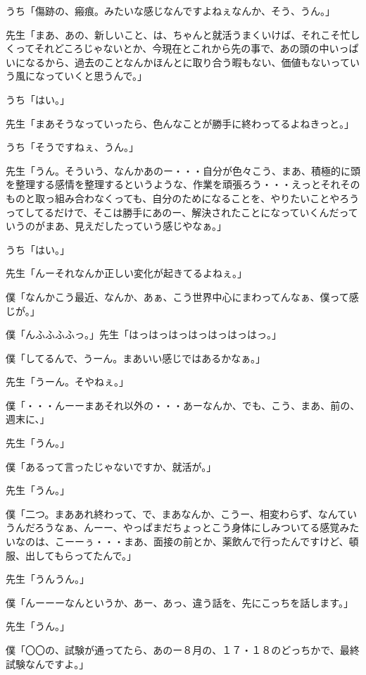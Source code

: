 \documentclass[b5j,twoside,twocolumn]{utarticle}
\begin{document}
\begin{description}
\item うち「傷跡の、瘢痕。みたいな感じなんですよねぇなんか、そう、うん。」
\item 先生「まあ、あの、新しいこと、は、ちゃんと就活うまくいけば、それこそ忙しくってそれどころじゃないとか、今現在とこれから先の事で、あの頭の中いっぱいになるから、過去のことなんかほんとに取り合う暇もない、価値もないっていう風になっていくと思うんで。」
\item うち「はい。」
\item 先生「まあそうなっていったら、色んなことが勝手に終わってるよねきっと。」
\item うち「そうですねぇ、うん。」
\item 先生「うん。そういう、なんかあのー・・・自分が色々こう、まあ、積極的に頭を整理する感情を整理するというような、作業を頑張ろう・・・えっとそれそのものと取っ組み合わなくっても、自分のためになることを、やりたいことやろうってしてるだけで、そこは勝手にあのー、解決されたことになっていくんだっていうのがまあ、見えだしたっていう感じやなぁ。」
\item うち「はい。」
\item 先生「んーそれなんか正しい変化が起きてるよねぇ。」
\item 僕「なんかこう最近、なんか、あぁ、こう世界中心にまわってんなぁ、僕って感じが。」
\item 僕「んふふふふっ。」先生「はっはっはっはっはっはっはっ。」
\item 僕「してるんで、うーん。まあいい感じではあるかなぁ。」
\item 先生「うーん。そやねぇ。」
\item 僕「・・・んーーまあそれ以外の・・・あーなんか、でも、こう、まあ、前の、週末に、」
\item 先生「うん。」
\item 僕「あるって言ったじゃないですか、就活が。」
\item 先生「うん。」
\item 僕「二つ。まああれ終わって、で、まあなんか、こうー、相変わらず、なんていうんだろうなぁ、んーー、やっぱまだちょっとこう身体にしみついてる感覚みたいなのは、こーーぅ・・・まあ、面接の前とか、薬飲んで行ったんですけど、頓服、出してもらってたんで。」
\item 先生「うんうん。」
\item 僕「んーーーなんというか、あー、あっ、違う話を、先にこっちを話します。」
\item 先生「うん。」
\item 僕「〇〇の、試験が通ってたら、あのー８月の、１７・１８のどっちかで、最終試験なんですよ。」

\end{description}
\end{document}
